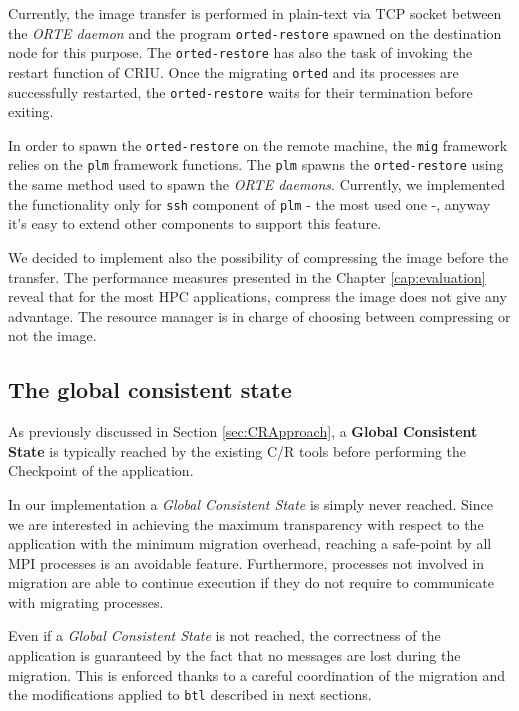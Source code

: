 Currently, the image transfer is performed in plain-text via TCP socket between the
\emph{ORTE daemon} and the program \texttt{orted-restore} spawned on the
destination node for this purpose. The \texttt{orted-restore}
has also the task of invoking the restart function of CRIU. Once the 
migrating \texttt{orted} and its processes are successfully restarted, the
\texttt{orted-restore} waits for their termination before exiting.

In order to spawn the \texttt{orted-restore} on the remote machine, the
\texttt{mig} framework relies on the \texttt{plm} framework functions. The
\texttt{plm} spawns the \linebreak \texttt{orted-restore} using the same method used
to spawn the \emph{ORTE daemons}. Currently, we implemented the functionality
only for \texttt{ssh} component of \texttt{plm} - the most used one -, anyway
it's easy to extend other components to support this feature.

We decided to implement also the possibility of compressing the image before the
transfer. The performance measures presented in the Chapter
\ref{cap:evaluation} reveal that for the most HPC applications, compress the
image does not give any advantage. The resource manager is in charge of
choosing between compressing or not the image. 

\subsection{The global consistent state}
As previously discussed in Section \ref{sec:CRApproach}, a \textbf{Global
Consistent State} is typically reached by the existing C/R tools before
performing the Checkpoint of the application.

In our implementation a \emph{Global Consistent State} is simply never reached.
Since we are interested in achieving the maximum transparency with respect to the
application with the minimum migration overhead, reaching a safe-point by all
MPI processes is an avoidable feature. Furthermore, processes not involved in
migration are able to continue execution if they do not require to communicate
with migrating processes.

Even if a \emph{Global Consistent State} is not reached, the correctness of the
application is guaranteed by the fact that no messages
are lost during the migration. This is enforced thanks to a careful
coordination of the migration and the modifications applied to \texttt{btl}
described in next sections.

